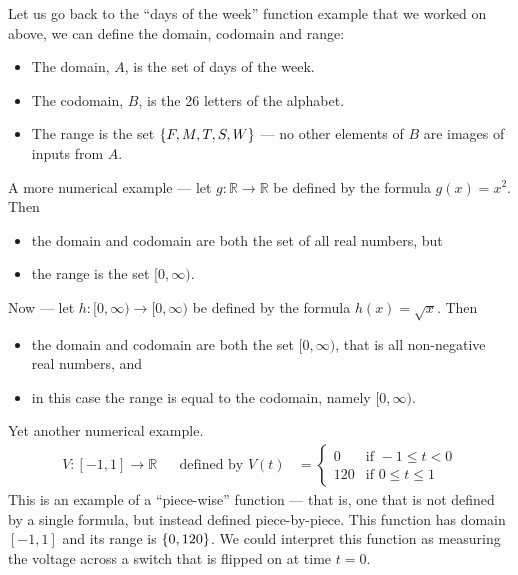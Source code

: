 \begin{eg}\label{eg_0_4_1}
Let us go back to the ``days of the week'' function example that we
worked on above, we can define the domain, codomain and range:
\begin{itemize}
 \item The domain, $A$, is the set of days of the week.
\item The codomain, $B$, is the 26 letters of the alphabet.
\item The range is the set $\left\{F,M,T,S,W\right\}$ --- no other elements of $B$ are
images of inputs from $A$.
\end{itemize}
\end{eg}
\begin{eg}\label{eg_0_4_2}
A more numerical example --- let $g: \mathbb{R} \to \mathbb{R}$ be defined
by the formula $g(x) = x^2$. Then
\begin{itemize}
 \item the domain and codomain are both the set of all real numbers, but
 \item the range is the set $[0, \infty)$.
\end{itemize}

Now --- let $h:[0,\infty) \to [0,\infty)$ be defined by the formula $h(x) =
\sqrt{x}$. Then
\begin{itemize}
 \item the domain and codomain are both the set $[0,\infty)$, that is all
non-negative real numbers, and
 \item in this case the range is equal to the codomain, namely $[0, \infty)$.
\end{itemize}
\end{eg}
\begin{eg}
\label{eg piecewise}
Yet another numerical example.
\begin{align*}
  V:[-1,1] \to \mathbb{R} && \text{defined by }
  V(t) &= \begin{cases}
          0 & \text{if } -1 \leq t < 0 \\
	  120 & \text{if } 0 \leq t \leq 1
          \end{cases}
\end{align*}
  This is an example of a ``piece-wise'' function --- that is, one that is not
defined by a single formula, but instead defined piece-by-piece. This function
has domain $[-1,1]$ and its range is $\left\{0,120\right\}$. We could interpret this
function as measuring the voltage across a switch that is flipped on at time $t=0$.
\end{eg}

